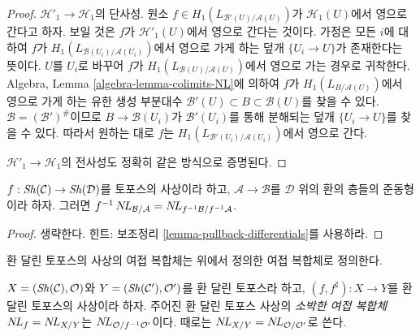 \begin{proof}
\medskip\noindent
$\mathcal{H}'_1 \to \mathcal{H}_1$의 단사성. 원소
$f \in H_1(L_{\mathcal{B}'(U)/\mathcal{A}(U)})$가
$\mathcal{H}_1(U)$에서 영으로 간다고 하자. 보일 것은 $f$가
$\mathcal{H}'_1(U)$에서 영으로 간다는 것이다. 가정은 모든 $i$에 대하여
$f$가 $H_1(L_{\mathcal{B}(U_i)/\mathcal{A}(U_i)})$에서 영으로 가게 하는
덮개 $\{U_i \to U\}$가 존재한다는 뜻이다. $U$를 $U_i$로 바꾸어
$f$가 $H_1(L_{\mathcal{B}(U)/\mathcal{A}(U)})$에서 영으로 가는 경우로
귀착한다. Algebra, Lemma \ref{algebra-lemma-colimits-NL}에 의하여
$f$가 $H_1(L_{B/\mathcal{A}(U)})$에서 영으로 가게 하는 유한 생성 부분대수
$\mathcal{B}'(U) \subset B \subset \mathcal{B}(U)$를 찾을 수 있다.
$\mathcal{B} = (\mathcal{B}')^\#$이므로 $B \to \mathcal{B}(U_i)$가
$\mathcal{B}'(U_i)$를 통해 분해되는 덮개 $\{U_i \to U\}$를 찾을 수 있다.
따라서 원하는 대로 $f$는
$H_1(L_{\mathcal{B}'(U_i)/\mathcal{A}(U_i)})$에서 영으로 간다.

\medskip\noindent
$\mathcal{H}'_1 \to \mathcal{H}_1$의 전사성도 정확히 같은 방식으로
증명된다.
\end{proof}

\begin{lemma}
\label{lemma-pullback-NL}
$f : \mathop{\mathit{Sh}}\nolimits(\mathcal{C}) \to \mathop{\mathit{Sh}}\nolimits(\mathcal{D})$를 토포스의 사상이라 하고,
$\mathcal{A} \to \mathcal{B}$를 $\mathcal{D}$ 위의 환의 층들의
준동형이라 하자. 그러면 $f^{-1}\mathop{N\!L}\nolimits_{\mathcal{B}/\mathcal{A}} =
\mathop{N\!L}\nolimits_{f^{-1}\mathcal{B}/f^{-1}\mathcal{A}}$.
\end{lemma}

\begin{proof}
생략한다. 힌트: 보조정리 \ref{lemma-pullback-differentials}를 사용하라.
\end{proof}

\noindent
환 달린 토포스의 사상의 여접 복합체는 위에서 정의한 여접 복합체로
정의한다.

\begin{definition}
\label{definition-cotangent-complex-morphism-ringed-topoi}
$X = (\mathop{\mathit{Sh}}\nolimits(\mathcal{C}), \mathcal{O})$와
$Y = (\mathop{\mathit{Sh}}\nolimits(\mathcal{C}'), \mathcal{O}')$를 환 달린 토포스라 하고,
$(f, f^\sharp) : X \to Y$를 환 달린 토포스의 사상이라 하자.
주어진 환 달린 토포스 사상의 {\it 소박한 여접 복합체}
$\mathop{N\!L}\nolimits_f = \mathop{N\!L}\nolimits_{X/Y}$는 $\mathop{N\!L}\nolimits_{\mathcal{O}/f^{-1}\mathcal{O}'}$이다.
때로는 $\mathop{N\!L}\nolimits_{X/Y} = \mathop{N\!L}\nolimits_{\mathcal{O}/\mathcal{O}'}$로 쓴다.
\end{definition}









